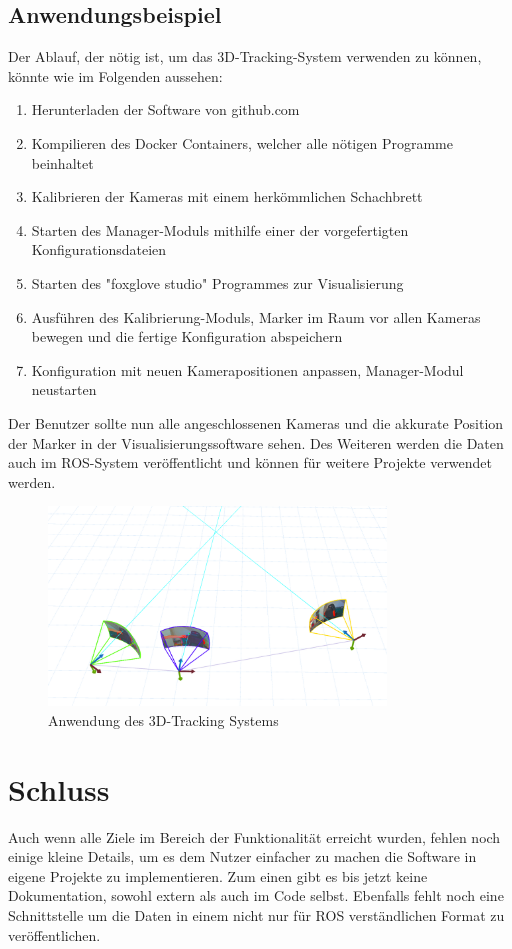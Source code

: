 \documentclass[12pt, ngerman]{article}
\begin{document}
\subsection{Anwendungsbeispiel}
Der Ablauf, der nötig ist, um das 3D-Tracking-System verwenden zu können, könnte wie im Folgenden aussehen:

\begin{enumerate}
  \item Herunterladen der Software von github.com
  \item Kompilieren des Docker Containers, welcher alle nötigen Programme beinhaltet
  \item Kalibrieren der Kameras mit einem herkömmlichen Schachbrett
  \item Starten des Manager-Moduls mithilfe einer der vorgefertigten Konfigurationsdateien
  \item Starten des "foxglove studio" Programmes zur Visualisierung
  \item Ausführen des Kalibrierung-Moduls, Marker im Raum vor allen Kameras bewegen und die fertige Konfiguration abspeichern
  \item Konfiguration mit neuen Kamerapositionen anpassen, Manager-Modul neustarten
\end{enumerate}

Der Benutzer sollte nun alle angeschlossenen Kameras und die akkurate Position der Marker in der Visualisierungssoftware sehen. Des Weiteren werden die Daten auch im ROS-System veröffentlicht und können für weitere Projekte verwendet werden.
\vspace{8pt}
\begin{figure}[hbtp!]
  \centering
  \includegraphics[width=0.8\textwidth]{live.png}
  \caption{Anwendung des 3D-Tracking Systems}
  \label{Abb: live}
\end{figure}

\section{Schluss}
Auch wenn alle Ziele im Bereich der Funktionalität erreicht wurden, fehlen noch einige kleine Details, um es dem Nutzer einfacher zu machen die Software in eigene Projekte zu implementieren. Zum einen gibt es bis jetzt keine Dokumentation, sowohl extern als auch im Code selbst. Ebenfalls fehlt noch eine Schnittstelle um die Daten in einem nicht nur für ROS verständlichen Format zu veröffentlichen. 
\end{document}
